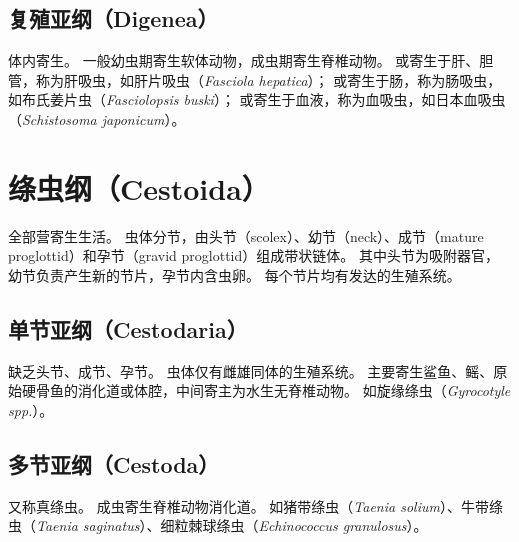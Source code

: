 \documentclass[11pt]{article}
\begin{document}
\subsection{复殖亚纲（Digenea）}
体内寄生。
一般幼虫期寄生软体动物，成虫期寄生脊椎动物。
或寄生于肝、胆管，称为肝吸虫，如肝片吸虫（\textit{Fasciola hepatica}）；
或寄生于肠，称为肠吸虫，如布氏姜片虫（\textit{Fasciolopsis buski}）；
或寄生于血液，称为血吸虫，如日本血吸虫（\textit{Schistosoma japonicum}）。

\section{绦虫纲（Cestoida）}
全部营寄生生活。
虫体分节，由头节（scolex）、幼节（neck）、成节（mature proglottid）和孕节（gravid proglottid）组成带状链体。
其中头节为吸附器官，幼节负责产生新的节片，孕节内含虫卵。
每个节片均有发达的生殖系统。

\subsection{单节亚纲（Cestodaria）}
缺乏头节、成节、孕节。
虫体仅有雌雄同体的生殖系统。
主要寄生鲨鱼、鳐、原始硬骨鱼的消化道或体腔，中间寄主为水生无脊椎动物。
如旋缘绦虫（\textit{Gyrocotyle spp.}）。

\subsection{多节亚纲（Cestoda）}
又称真绦虫。
成虫寄生脊椎动物消化道。
如猪带绦虫（\textit{Taenia solium}）、牛带绦虫（\textit{Taenia saginatus}）、细粒棘球绦虫（\textit{Echinococcus granulosus}）。
\end{document}
